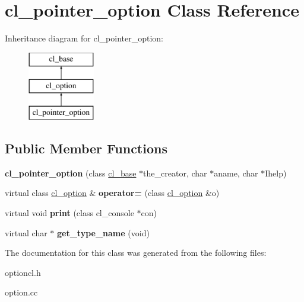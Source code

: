 \hypertarget{classcl__pointer__option}{
\section{cl\_\-pointer\_\-option Class Reference}
\label{classcl__pointer__option}
}
Inheritance diagram for cl\_\-pointer\_\-option:\begin{figure}[H]
\begin{center}
\leavevmode
\includegraphics[height=3.000000cm]{classcl__pointer__option}
\end{center}
\end{figure}
\subsection*{Public Member Functions}
\begin{DoxyCompactItemize}
\item 
\hypertarget{classcl__pointer__option_af10fddcb604f7fadde941d2f490c6a0b}{
{\bfseries cl\_\-pointer\_\-option} (class \hyperlink{classcl__base}{cl\_\-base} $\ast$the\_\-creator, char $\ast$aname, char $\ast$Ihelp)}
\label{classcl__pointer__option_af10fddcb604f7fadde941d2f490c6a0b}

\item 
\hypertarget{classcl__pointer__option_a8e5dab7a00f6172e11b8ba49ddb44beb}{
virtual class \hyperlink{classcl__option}{cl\_\-option} \& {\bfseries operator=} (class \hyperlink{classcl__option}{cl\_\-option} \&o)}
\label{classcl__pointer__option_a8e5dab7a00f6172e11b8ba49ddb44beb}

\item 
\hypertarget{classcl__pointer__option_a0dcfc8cbac864eaffd94395b529bfdeb}{
virtual void {\bfseries print} (class cl\_\-console $\ast$con)}
\label{classcl__pointer__option_a0dcfc8cbac864eaffd94395b529bfdeb}

\item 
\hypertarget{classcl__pointer__option_a1fe03453858ddee4ff5b77c6adc2f293}{
virtual char $\ast$ {\bfseries get\_\-type\_\-name} (void)}
\label{classcl__pointer__option_a1fe03453858ddee4ff5b77c6adc2f293}

\end{DoxyCompactItemize}


The documentation for this class was generated from the following files:\begin{DoxyCompactItemize}
\item 
optioncl.h\item 
option.cc\end{DoxyCompactItemize}
